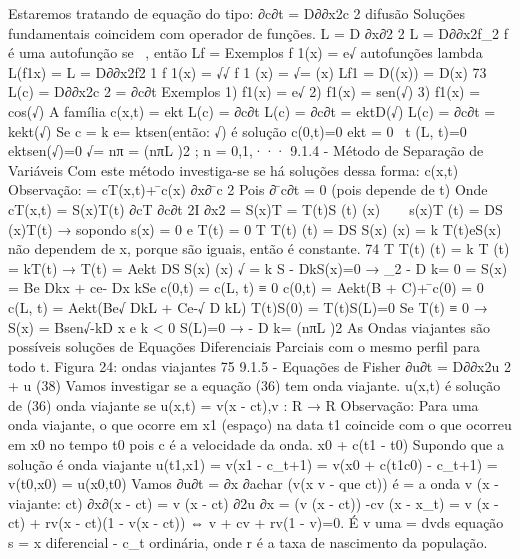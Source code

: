{{{{{{{{{{{{{{{{{{{{{Estaremos tratando de equação do tipo: 
∂c∂t = D∂∂x2c 2 
} 
difusão 
Soluções fundamentais coincidem com operador de funções. L = D ∂x∂2 2 
L = D∂∂x2f_{2} 
f é uma autofunção se \exists\ \lambda \in , então Lf = \lambdaf 
Exemplos f 1(x) = e\pmde √\lambdax 
autofunções 
lambda  
L(f1x) = L = D∂∂x2f2 1 
f 1(x) = \pm√\lambdae\pm√\lambdax 
f 1 (x) = \lambda\pm√\lambdax = (x) 
\Rightarrow  Lf1 = D((x)) = D(x) 
73 
L(c) = D∂∂x2c 
2 = ∂c∂t 
Exemplos 
1) f1(x) = e\pm√\lambdax \lambda {} 2) f1(x) = sen(\pm√\lambdax) 3) f1(x) = cos(\pm√\lambdax) 
A família c(x,t) = ekt L(c) = ∂c∂t L(c) = ∂c∂t = ektD\lambdasen(\pm√\lambdax) L(c) = ∂c∂t = kekt\lambdasen(\pm√\lambdax) 
Se c = k e= ktsen(\pmD\lambda então: 
√\lambdax) é solução c(0,t)=0 \Rightarrow  ekt = 0 \forall\ t 
(L, t)=0 \Rightarrow  ektsen(\pm√\lambdaL)=0 
\pm√\lambdaL = nπ 
\lambda = 
(nπL 
)2 ; n = 0,1,··· 
9.1.4 - Método de Separação de Variáveis 
Com este método investiga-se se há soluções dessa forma: c(x,t) Observação: = cT(x,t)+ ̄c(x) 
∂x∂ ̄c 
2 Pois ∂ ̄c∂t = 0 (pois depende de t) Onde cT(x,t) = S(x)T(t) 
∂cT ∂c∂t 2I ∂x2 = S(x)T = T(t)S (t) 
(x) 
 \Rightarrow  s(x)T (t) = DS (x)T(t) → sopondo s(x) = 0 e T(t) = 0 
T T(t) (t) 
= DS S(x) (x) 
= k 
T(t)eS(x) não dependem de x, porque são iguais, então é constante. 
74 
{ T T(t) (t) 
= k \Rightarrow  T (t) = kT(t) → T(t) = Aekt 
DS S(x) (x) 
√ = k \Rightarrow  S - DkS(x)=0 → \lambda_{2} - D k= 0 \lambda = \pmkD 
S(x) = Be 
Dkx + ce- Dx kSe c(0,t) = c(L, t) ≡ 0 
c(0,t) = Aekt(B + C)+ ̄c(0) = 0 
c(L, t) = Aekt(Be√ DkL + Ce-√ D kL) 
T(t)S(0) = T(t)S(L)=0 Se T(t) ≡ 0 → S(x) = Bsen√-kD x e k < 0 
S(L)=0 → - D k= 
(nπL 
)2 
As Ondas viajantes são possíveis soluções de Equações Diferenciais Parciais com o mesmo perfil para todo t. 
Figura 24: ondas viajantes 
75 
9.1.5 - Equações de Fisher 
∂u∂t = D∂∂x2u 
2 + \gamma u (38) 
Vamos investigar se a equação (36) tem onda viajante. u(x,t) é solução de (36) onda viajante se u(x,t) = v(x - ct),v : R → R Observação: Para uma onda viajante, o que ocorre em x1 (espaço) na data t1 coincide com o que ocorreu em x0 no tempo t0 pois c é a velocidade da onda. 
x0 + c(t1 - t0) Supondo que a solução é onda viajante 
u(t1,x1) = v(x1 - c_{t+1}) = v(x0 + c(t1c0) - c_{t+1}) = v(t0,x0) = u(x0,t0) Vamos ∂u∂t = ∂x ∂achar (v(x v - que ct)) é = a onda v (x - viajante: ct) ∂x∂(x - ct) = v (x - ct) 
∂2u ∂x = (v (x - ct)) 
-cv (x - x_{t}) = v (x - ct) + rv(x - ct)(1 - v(x - ct)) 
⇔ v + cv + rv(1 - v)=0. É v uma = dvds equação s = x diferencial - c_{t} 
ordinária, onde r é a taxa de nascimento da população. 
}}}}}}}}}}}}}}}}}}}}}
